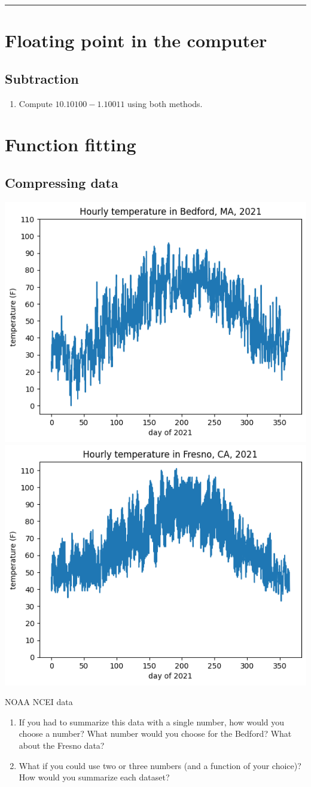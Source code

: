 \documentclass[12pt,letterpaper,noanswers]{exam}
\begin{document}
\vspace{0.2cm}
\hrule
\vspace{0.2cm}

\section{Floating point in the computer}

\subsection{Subtraction}

\begin{enumerate}
    \item Compute $10.10100 - 1.10011$ using both methods.
    \vspace{1.5in}
\end{enumerate}

\section{Function fitting}
\subsection{Compressing data}

\includegraphics[width=0.45\linewidth]{img/C03weatherBedford.png}
\includegraphics[width=0.45\linewidth]{img/C03weatherFresno.png}

NOAA NCEI data

\begin{enumerate}[resume]
\itemsep40pt
\item If you had to summarize this data with a single number, how would you choose a number?  What number would you choose for the Bedford? What about the Fresno data?


\item What if you could use two or three numbers (and a function of your choice)?  How would you summarize each dataset?
\end{enumerate}
\vspace{1cm}
\end{document}

